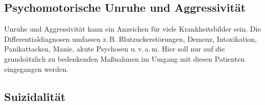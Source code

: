 % 
% 
% 
% 
% 
% 
% 
% 


\subsection{Psychomotorische Unruhe und Aggressivität}

Unruhe und Aggressivität kann ein Anzeichen für viele
Krankheitsbilder sein. Die Differentialdiagnosen umfassen
z.\,B. Blutzuckerstörungen, Demenz, Intoxikation,
Panikattacken, Manie, akute Psychosen u.\,v.\,a.\,m. Hier soll nur
auf die grundsätzlich zu bedenkenden Maßnahmen im Umgang mit diesen Patienten
eingegangen werden. 

% 
% 

\subsection{Suizidalität}
\label{topic:suizidalität}
\label{topic:suizid1}



